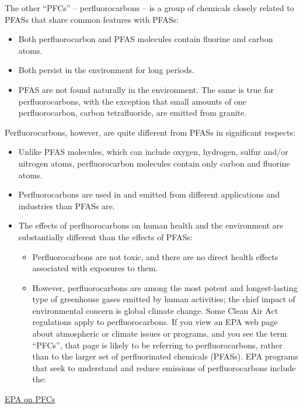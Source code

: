 \documentclass[
]{book}
\providecommand{\tightlist}{%
  \setlength{\itemsep}{0pt}\setlength{\parskip}{0pt}}
\begin{document}
The other ``PFCs'' -- perfluorocarbons --
is a group of chemicals closely related to PFASs that share common features with PFASs:

\begin{itemize}
\tightlist
\item
  Both perfluorocarbon and PFAS molecules contain fluorine and carbon atoms.
\item
  Both persist in the environment for long periods.
\item
  PFAS are not found naturally in the environment. The same is true for perfluorocarbons, with the exception that small amounts of one perfluorocarbon, carbon tetrafluoride, are emitted from granite.
\end{itemize}

Perfluorocarbons, however, are quite different from PFASs in significant respects:

\begin{itemize}
\tightlist
\item
  Unlike PFAS molecules, which can include oxygen, hydrogen, sulfur and/or nitrogen atoms, perfluorocarbon molecules contain only carbon and fluorine atoms.
\item
  Perfluorocarbons are used in and emitted from different applications and industries than PFASs are.
\item
  The effects of perfluorocarbons on human health and the environment are substantially different than the effects of PFASs:

  \begin{itemize}
  \item
    Perfluorocarbons are not toxic, and there are no direct health effects associated with exposures to them.
  \item
    However, perfluorocarbons are among the most potent and longest-lasting type of greenhouse gases emitted by human activities; the chief impact of environmental concern is global climate change. Some Clean Air Act regulations apply to perfluorocarbons. If you view an EPA web page about atmospheric or climate issues or programs, and you see the term ``PFCs'', that page is likely to be referring to perfluorocarbons, rather than to the larger set of perfluorinated chemicals (PFASs). EPA programs that seek to understand and reduce emissions of perfluorocarbons include the:
  \end{itemize}
\end{itemize}

\href{https://www.epa.gov/pfas/what-are-pfcs-and-how-do-they-relate-and-polyfluoroalkyl-substances-pfass}{EPA on PFCs}
\end{document}
